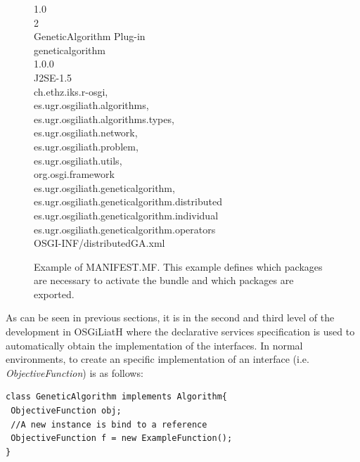 \documentclass{sig-alternate}
\begin{document}
\begin{figure}[t]
\noindent
\ttfamily
{} 1.0\\
 2\\
 GeneticAlgorithm Plug-in\\
 geneticalgorithm\\
 1.0.0\\
 J2SE-1.5\\
 ch.ethz.iks.r-osgi,\\
 \hlstd{}es.ugr.osgiliath.algorithms,\\
 \hlstd{}es.ugr.osgiliath.algorithms.types,\\
 \hlstd{}es.ugr.osgiliath.network,\\
 \hlstd{}es.ugr.osgiliath.problem,\\
 \hlstd{}es.ugr.osgiliath.utils,\\
  \hlstd{}org.osgi.framework\\
 es.ugr.osgiliath.geneticalgorithm,\\
 \hlstd{}es.ugr.osgiliath.geneticalgorithm.distributed\\
  \hlstd{}es.ugr.osgiliath.geneticalgorithm.individual\\
   \hlstd{}es.ugr.osgiliath.geneticalgorithm.operators\\
\hlstd{} OSGI-INF/distributedGA.xml\\
\mbox{}
 
\normalfont
\label{fig:manifest}
\caption{Example of MANIFEST.MF. This example defines which packages are necessary to activate the bundle and which packages are exported.}
\end {figure}

As can be seen in previous sections, it is in the second and third level of the development in OSGiLiatH where the declarative services specification is used to automatically obtain the implementation of the interfaces. In normal environments, to create an specific implementation of an interface (i.e. {\em ObjectiveFunction}) is as follows:

\begin{lstlisting}
class GeneticAlgorithm implements Algorithm{
 ObjectiveFunction obj;
 //A new instance is bind to a reference
 ObjectiveFunction f = new ExampleFunction();
}
\end{lstlisting}
 
\end{document}
